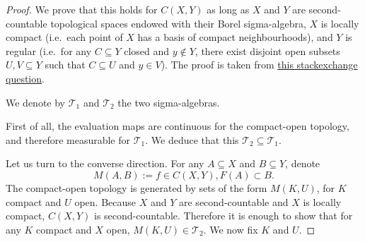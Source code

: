 \begin{proof}\leanok
We prove that this holds for $C(X, Y)$ as long as $X$ and $Y$ are second-countable topological spaces endowed with their Borel sigma-algebra, $X$ is locally compact (i.e.\ each point of $X$ has a basis of compact neighbourhoods), and $Y$ is regular (i.e.\ for any $C \subseteq Y$ closed and $y \notin Y$, there exist disjoint open subsets $U, V \subseteq Y$ such that $C \subseteq U$ and $y \in V$). The proof is taken from \href{https://math.stackexchange.com/questions/4789531/when-does-the-borel-sigma-algebra-of-compact-convergence-coincide-with-the-pr}{this stackexchange question}.

We denote by $\mathcal{T}_1$ and $\mathcal{T}_2$ the two sigma-algebras.

First of all, the evaluation maps are continuous for the compact-open topology, and therefore measurable for $\mathcal{T}_1$. We deduce that this $\mathcal{T}_2 \subseteq \mathcal{T}_1$.

Let us turn to the converse direction. For any $A \subseteq X$ and $B \subseteq Y$, denote
$$M(A, B) := {f \in C(X, Y), F(A) \subset B}.$$
The compact-open topology is generated by sets of the form $M(K, U)$, for $K$ compact and $U$ open. Because $X$ and $Y$ are second-countable and $X$ is locally compact, $C(X, Y)$ is second-countable.
Therefore it is enough to show that for any $K$ compact and $X$ open, $M(K, U) \in \mathcal{T}_2$. We now fix $K$ and $U$.


\end{proof}
